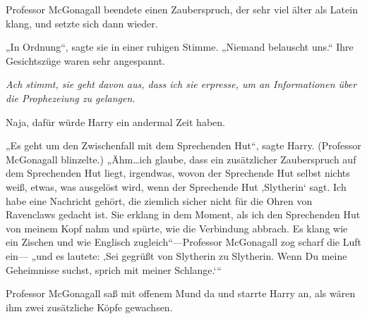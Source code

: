 Professor McGonagall beendete einen Zauberspruch, der sehr viel älter als Latein klang, und setzte sich dann wieder.

„In Ordnung“, sagte sie in einer ruhigen Stimme. „Niemand belauscht uns.“ Ihre Gesichtszüge waren sehr angespannt.

\emph{Ach stimmt, sie geht davon aus, dass ich sie erpresse, um an Informationen über die Prophezeiung zu gelangen.}

Naja, dafür würde Harry ein andermal Zeit haben.

„Es geht um den Zwischenfall mit dem Sprechenden Hut“, sagte Harry. (Professor McGonagall blinzelte.) „Ähm…ich glaube, dass ein zusätzlicher Zauberspruch auf dem Sprechenden Hut liegt, irgendwas, wovon der Sprechende Hut selbst nichts weiß, etwas, was ausgelöst wird, wenn der Sprechende Hut ‚Slytherin‘ sagt. Ich habe eine Nachricht gehört, die ziemlich sicher nicht für die Ohren von Ravenclaws gedacht ist. Sie erklang in dem Moment, als ich den Sprechenden Hut von meinem Kopf nahm und spürte, wie die Verbindung abbrach. Es klang wie ein Zischen und wie Englisch zugleich“—Professor McGonagall zog scharf die Luft ein— „und es lautete: ‚Sei gegrüßt von Slytherin zu Slytherin. Wenn Du meine Geheimnisse suchst, sprich mit meiner Schlange.‘“

Professor McGonagall saß mit offenem Mund da und starrte Harry an, als wären ihm zwei zusätzliche Köpfe gewachsen.



